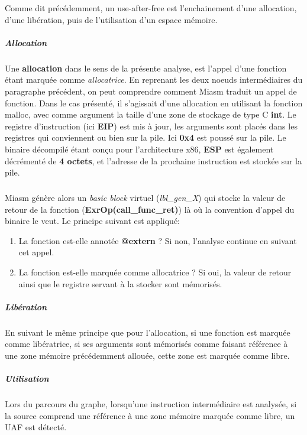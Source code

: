 Comme dit précédemment, un use-after-free est l'enchainement d'une allocation, d'une libération, puis de l'utilisation d'un espace mémoire.
\subparagraph{Allocation}
Une \textbf{allocation} dans le sens de la présente analyse, est l'appel d'une fonction étant marquée comme \textit{allocatrice}. En reprenant les deux noeuds intermédiaires
du paragraphe précédent, on peut comprendre comment Miasm traduit un appel de fonction. Dans le cas présenté, il s'agissait d'une allocation en utilisant la fonction malloc,
avec comme argument la taille d'une zone de stockage de type C \textbf{int}.
Le registre d'instruction (ici \textbf{EIP}) est mis à jour, les arguments sont placés dans les registres qui conviennent ou bien sur la pile.
Ici \textbf{0x4} est poussé sur la pile. Le binaire décompilé étant conçu pour l'architecture x86, \textbf{ESP} est également décrémenté de \textbf{4 octets},
et l'adresse de la prochaine instruction est stockée sur la pile.
\subparagraph{}
Miasm génère alors un \textit{basic block} virtuel (\textit{lbl\_gen\_X}) qui stocke la valeur de retour de la fonction (\textbf{ExrOp(call\_func\_ret)})
là où la convention d'appel du binaire le veut. Le principe suivant est appliqué:
\begin{enumerate}
    \item La fonction est-elle annotée \textbf{@extern} ? Si non, l'analyse continue en suivant cet appel.
    \item La fonction est-elle marquée comme allocatrice ? Si oui, la valeur de retour ainsi que le registre servant à la stocker sont mémorisés.
\end{enumerate}

\subparagraph{Libération}
En suivant le même principe que pour l'allocation, si une fonction est marquée comme libératrice, si ses arguments sont mémorisés comme faisant référence
à une zone mémoire précédemment allouée, cette zone est marquée comme libre.

\subparagraph{Utilisation}
Lors du parcours du graphe, lorsqu'une instruction intermédiaire est analysée, si la source comprend une référence à une zone mémoire marquée comme libre,
un UAF est détecté.

